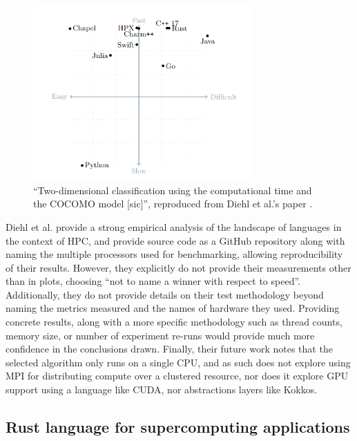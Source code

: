 \begin{figure}[H]
    \centering
    \includegraphics[width=0.75\textwidth]{images/2_background/1d_heat_results.png}
    \caption{``Two-dimensional classification using the computational time and the \acrshort{COCOMO} model [sic]'', reproduced from Diehl et al.'s paper \cite{diehlBenchmarkingParallel1D2023}.}
    \label{fig:1d_heat_results}
\end{figure}

Diehl et al. provide a strong empirical analysis of the landscape of languages in the context of \acrshort{HPC}, and provide source code as a GitHub repository \cite{diehlInitialRelease2023} along with naming the multiple processors used for benchmarking, allowing reproducibility of their results. However, they explicitly do not provide their measurements other than in plots, choosing ``not to name a winner with respect to speed''. Additionally, they do not provide details on their test methodology beyond naming the metrics measured and the names of hardware they used. Providing concrete results, along with a more specific methodology such as thread counts, memory size, or number of experiment re-runs would provide much more confidence in the conclusions drawn. Finally, their future work notes that the selected algorithm only runs on a single CPU, and as such does not explore using MPI for distributing compute over a clustered resource, nor does it explore GPU support using a language like CUDA, nor abstractions layers like Kokkos.

\subsection{Rust language for supercomputing applications}
\label{ssec:bychkov-nikolskiy}

